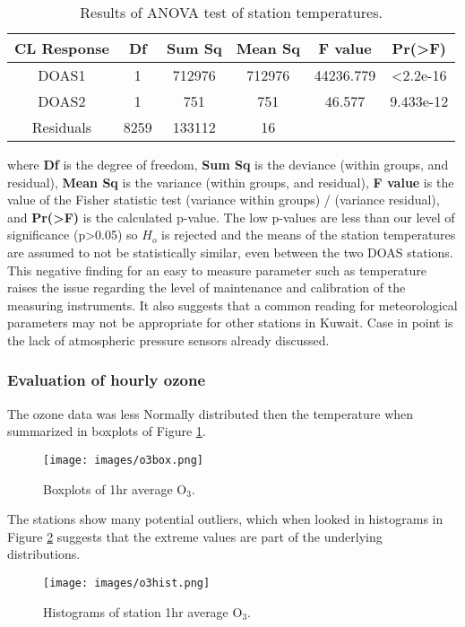 \begin{table}[H]
\centering
\caption{Results of ANOVA test of station temperatures.}
\label{tab:anovatemp}
\begin{tabular}{@{}cccccc@{}}
\toprule
\textbf{CL Response} & \textbf{Df} & \textbf{Sum Sq} & \textbf{Mean Sq} & \textbf{F value} & \textbf{Pr(>F)} \\ \midrule
DOAS1 & 1 & 712976 & 712976 & 44236.779 & \textless 2.2e-16  \\
DOAS2 & 1 & 751 & 751 & 46.577 & 9.433e-12  \\
Residuals & 8259 & 133112 & 16 &  &  \\ \bottomrule
\end{tabular}
\end{table}

\noindent
where \textbf{Df}  is the degree of freedom, \textbf{Sum Sq} is the deviance (within groups, and residual), \textbf{Mean Sq} is the  variance (within groups, and residual), \textbf{F value} is  the value of the Fisher statistic test (variance within groups) / (variance residual), and \textbf{Pr(>F)} is the calculated p-value. The low p-values are less than our level of significance (p>0.05) so  $H_{o}$ is rejected and the means of the station temperatures are assumed to not be statistically similar, even between the two DOAS stations. This negative finding for an easy to measure parameter such as temperature raises the issue regarding the level of maintenance and calibration of the measuring instruments. It also suggests that a common reading for meteorological parameters may not be appropriate for other stations in Kuwait. Case in point is the lack of atmospheric pressure sensors already discussed.  

\subsubsection{Evaluation of hourly ozone}
The ozone data was less Normally distributed then the temperature when summarized in boxplots of Figure \ref{fig:o3box}.
%
\begin{figure}[H]
\centering
\texttt{[image: images/o3box.png]} 
\caption{Boxplots of 1hr average O$_{3}$.}
\label{fig:o3box}
\end{figure}
%
The stations show many potential outliers, which when looked in histograms in Figure \ref{fig:o3hist} suggests that the extreme values are part of the underlying distributions.

%
\begin{figure}[H]
\centering
\texttt{[image: images/o3hist.png]} 
\caption{Histograms of station 1hr average O$_{3}$.}
\label{fig:o3hist}
\end{figure}
%

